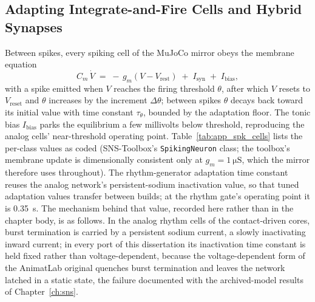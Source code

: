 \subsection{Adapting Integrate-and-Fire Cells and Hybrid Synapses}

Between spikes, every spiking cell of the MuJoCo mirror obeys the membrane equation
\begin{equation}
    C_{m}\,\dot{V} \;=\; -\,g_{m}\left(V - V_{\text{rest}}\right)
        \;+\; I_{\text{syn}} \;+\; I_{\text{bias}},
    \label{eq:app_lif}
\end{equation}
with a spike emitted when $V$ reaches the firing threshold $\theta$, after which $V$ resets to $V_{\text{reset}}$ and $\theta$ increases by the increment $\Delta\theta$; between spikes $\theta$ decays back toward its initial value with time constant $\tau_{\theta}$, bounded by the adaptation floor. The tonic bias $I_{\text{bias}}$ parks the equilibrium a few millivolts below threshold, reproducing the analog cells' near-threshold operating point. Table~\ref{tab:app_spk_cells} lists the per-class values as coded (SNS-Toolbox's \texttt{SpikingNeuron} class; the toolbox's membrane update is dimensionally consistent only at $g_{m} = \qty{1}{\micro\siemens}$, which the mirror therefore uses throughout). The rhythm-generator adaptation time constant reuses the analog network's persistent-sodium inactivation value, so that tuned adaptation values transfer between builds; at the rhythm gate's operating point it is \qty{0.35}{\second}. The mechanism behind that value, recorded here rather than in the chapter body, is as follows. In the analog rhythm cells of the contact-driven cores, burst termination is carried by a persistent sodium current, a slowly inactivating inward current; in every port of this dissertation its inactivation time constant is held fixed rather than voltage-dependent, because the voltage-dependent form of the AnimatLab original quenches burst termination and leaves the network latched in a static state, the failure documented with the archived-model results of Chapter~\ref{ch:sns}.

